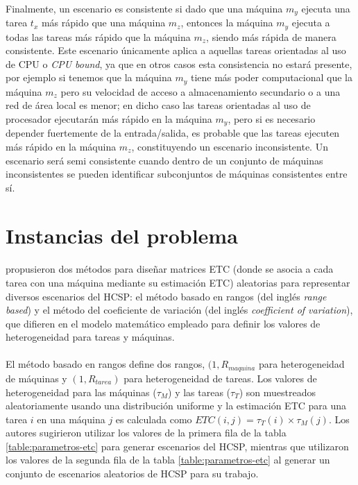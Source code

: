 \paragraph{}Finalmente, un escenario es consistente si dado que una máquina $m_y$ ejecuta una tarea $t_x$ más rápido que una máquina $m_z$, entonces la máquina $m_y$ ejecuta a todas las tareas más rápido que la máquina $m_z$, siendo más rápida de manera consistente. Este escenario únicamente aplica a aquellas tareas orientadas al uso de CPU o \textit{CPU bound}, ya que en otros casos esta consistencia no estará presente, por ejemplo si tenemos que la máquina $m_y$ tiene más poder computacional que la máquina $m_z$ pero su velocidad de acceso a almacenamiento secundario o a una red de área local es menor; en dicho caso las tareas orientadas al uso de procesador ejecutarán más rápido en la máquina $m_y$, pero si es necesario depender fuertemente de la entrada/salida, es probable que las tareas ejecuten más rápido en la máquina $m_z$, constituyendo un escenario inconsistente. Un escenario será semi consistente cuando dentro de un conjunto de máquinas inconsistentes se pueden identificar subconjuntos de máquinas consistentes entre sí.

\section{Instancias del problema} \label{section:descripcion-problema,subsection:instancias-del-problema}

\paragraph{}\citet{bib-ali-hc-etc} propusieron dos métodos para diseñar matrices ETC (donde se asocia a cada tarea con una máquina mediante su estimación ETC) aleatorias para representar diversos escenarios del HCSP: el método basado en rangos (del inglés \textit{range based}) y el método del coeficiente de variación (del inglés \textit{coefficient of variation}), que difieren en el modelo matemático empleado para definir los valores de heterogeneidad para tareas y máquinas.

\paragraph{}El método basado en rangos define dos rangos, $(1, R_{maquina}$ para heterogeneidad de máquinas y $(1, R_{tarea})$ para heterogeneidad de tareas. Los valores de heterogeneidad para las máquinas ($\tau_{M}$) y las tareas ($\tau_{T}$) son muestreados aleatoriamente usando una distribución uniforme y la estimación ETC para una tarea $i$ en una máquina $j$ es calculada como $ETC(i,j) = \tau_{T}(i) \times \tau_{M}(j)$. Los autores sugirieron utilizar los valores de la primera fila de la tabla \ref{table:parametros-etc} para generar escenarios del HCSP, mientras que \citet{bib-braun} utilizaron los valores de la segunda fila de la tabla \ref{table:parametros-etc} al generar un conjunto de escenarios aleatorios de HCSP para su trabajo.

